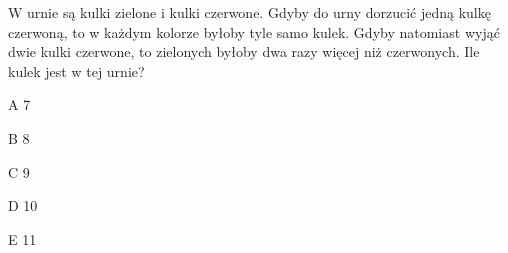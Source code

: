 \begin{tresc}
W urnie są kulki zielone i kulki czerwone. Gdyby do urny dorzucić jedną kulkę czerwoną, to w każdym kolorze byłoby tyle samo kulek. Gdyby natomiast wyjąć dwie kulki czerwone, to zielonych byłoby dwa razy więcej niż czerwonych. Ile kulek jest w tej urnie?
\end{tresc}
\begin{wariant}{A} 7 \end{wariant}
\begin{wariant}{B} 8 \end{wariant}
\begin{wariant}{C} 9 \end{wariant}
\begin{wariant}{D} 10 \end{wariant}
\begin{wariant}{E} 11 \end{wariant}

